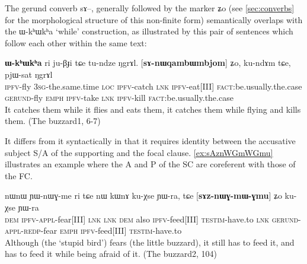 \documentclass[oldfontcommands,oneside,a4paper,11pt]{article}
\newcommand{\ipa}[1]{{\phon \mbox{#1}}} %
\begin{document}
The gerund converb \ipa{sɤ}--, generally followed by the marker \ipa{ʑo} (see \ref{sec:converbs} for the morphological structure of this non-finite form)   semantically overlaps with the \ipa{ɯ-kʰɯkʰa} `while' construction, as illustrated by this pair of sentences which follow each other within the same text:

\begin{exe}
\ex \label{ex:sanWqambWmbjom}
\gll [\ipa{ɲɯ-nɯqambɯmbjom}]  \textbf{	\ipa{ɯ-kʰɯkʰa}}  	\ipa{ri}  	\ipa{ju-βɟi}  	\ipa{tɕe}  	\ipa{tu-ndze}  	\ipa{ŋgrɤl.}  	[\textbf{\ipa{sɤ-nɯqambɯmbjom}}]  	\ipa{ʑo,}  	\ipa{ku-ndɤm}  	\ipa{tɕe,}  	\ipa{pjɯ-sat}  	\ipa{ŋgrɤl}  \\
\textsc{ipfv}-fly \textsc{3sg}-the.same.time \textsc{loc} \textsc{ipfv}-catch \textsc{lnk} \textsc{ipfv}-eat[III] \textsc{fact}:be.usually.the.case 
\textsc{gerund}-fly \textsc{emph}
\textsc{ipfv}-take \textsc{lnk} \textsc{ipfv}-kill \textsc{fact}:be.usually.the.case 
\\
\glt It catches them while it flies and eats them, it catches them while flying and kills them. (The buzzard1, 6-7)
\end{exe} 
It differs from it syntactically in that it requires identity between the accusative subject S/A of the supporting and the focal clause. \ref{ex:sAznWGmWGmu} illustrates an example where the A and P of the SC are coreferent with those of the FC.

\begin{exe}
\ex \label{ex:sAznWGmWGmu}
\gll
 	\ipa{nɯnɯ}  	\ipa{ɲɯ-nɯɣ-me}  	\ipa{ri} \ipa{tɕe} 	\ipa{nɯ}  	\ipa{kɯnɤ}  	\ipa{ku-χse}  	\ipa{ɲɯ-ra,}  	\ipa{tɕe}  	[\textbf{\ipa{sɤz-nɯɣ-mɯ-ɣmu}}]  	\ipa{ʑo}  	\ipa{ku-χse}  	\ipa{ɲɯ-ra}  \\
 	\textsc{dem} \textsc{ipfv-appl}-fear[III] \textsc{lnk}  \textsc{lnk} \textsc{dem} also \textsc{ipfv}-feed[III] \textsc{testim}-have.to \textsc{lnk} \textsc{gerund-appl-redp}-fear \textsc{emph} \textsc{ipfv}-feed[III] \textsc{testim}-have.to \\
 	\glt Although (the `stupid bird') fears (the little buzzard), it still has to feed it, and has to feed it while being afraid of it. (The buzzard2, 104)
\end{exe}
\end{document}
